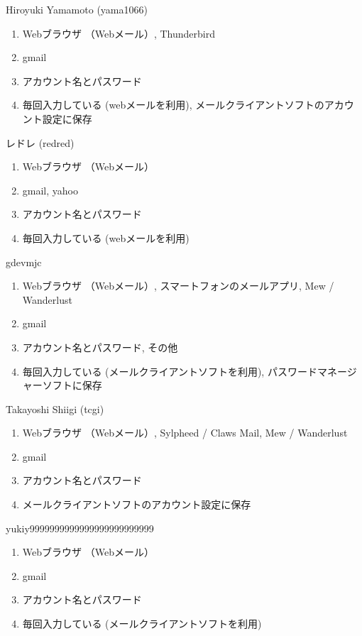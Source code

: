 \begin{prework}{ Hiroyuki Yamamoto (yama1066) }
  \begin{enumerate}
  \item Webブラウザ （Webメール）, Thunderbird
  \item gmail
  \item アカウント名とパスワード
  \item 毎回入力している (webメールを利用), メールクライアントソフトのアカウント設定に保存
  \end{enumerate}
\end{prework}

\begin{prework}{ レドレ (redred) }
  \begin{enumerate}
  \item Webブラウザ （Webメール）
  \item gmail, yahoo
  \item アカウント名とパスワード
  \item 毎回入力している (webメールを利用)
  \end{enumerate}
\end{prework}

\begin{prework}{ gdevmjc }
  \begin{enumerate}
  \item Webブラウザ （Webメール）, スマートフォンのメールアプリ, Mew / Wanderlust
  \item gmail
  \item アカウント名とパスワード, その他
  \item 毎回入力している (メールクライアントソフトを利用), パスワードマネージャーソフトに保存
  \end{enumerate}
\end{prework}

\begin{prework}{ Takayoshi Shiigi (tcgi) }
  \begin{enumerate}
  \item Webブラウザ （Webメール）, Sylpheed / Claws Mail, Mew / Wanderlust
  \item gmail
  \item アカウント名とパスワード
  \item メールクライアントソフトのアカウント設定に保存
  \end{enumerate}
\end{prework}

\begin{prework}{ yukiy9999999999999999999999999 }
  \begin{enumerate}
  \item Webブラウザ （Webメール）
  \item gmail
  \item アカウント名とパスワード
  \item 毎回入力している (メールクライアントソフトを利用)
  \end{enumerate}
\end{prework}
